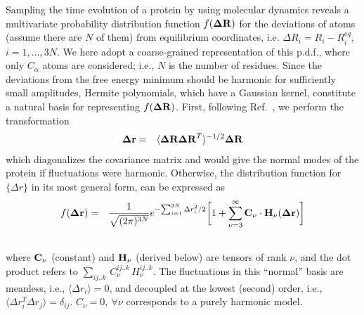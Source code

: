 \documentclass[prl,nofootinbib,twocolumn,floatfix,showpacs]{revtex4}
\begin{document}
Sampling the time evolution of a protein by using molecular dynamics
reveals a multivariate probability distribution function $f({\bf\Delta
  R})$ for the deviations of atoms (assume there are $N$ of them) from
equilibrium coordinates, i.e. $\Delta R_i = R_i - R_i^{eq}$,
$i=1,\dots,3N$. We here adopt a coarse-grained representation of this
p.d.f., where only $C_\alpha$ atoms are considered; i.e., $N$ is the
number of residues. Since the deviations from the free energy minimum
should be harmonic for sufficiently small amplitudes, Hermite
polynomials, which have a Gaussian kernel, constitute a natural basis
for representing $f({\bf\Delta R})$. First, following
Ref.~\cite{Yogurtcu}, we perform the transformation
\begin{eqnarray}
\label{transformation}
{\bf \Delta r} &=& \langle {\bf\Delta R \Delta R}^T\rangle ^{-1/2} {\bf
  \Delta R}
\end{eqnarray}
which diagonalizes the covariance matrix and would give the normal
modes of the protein if fluctuations were harmonic. Otherwise, the
distribution function for $\{\Delta r\}$ in its most general form, can
be expressed as~\cite{Flory}
\begin{eqnarray}
f({\bf\Delta r}) &=& \frac{1}{\sqrt{(2\pi)^{3N}}} e^{
    -{\sum_{i=1}^{3N} \Delta r_i^2}/2} \bigg[ 1 +  \sum_{\nu=3}^\infty
 {\bf C_\nu}\cdot {\bf H}_\nu({\bf \Delta r}) \bigg] \nonumber \\
&& \label{hermite_expansion}
\end{eqnarray}
where ${\bf C}_\nu$ (constant) and ${\bf H}_\nu$ (derived below) are
tensors of rank $\nu$, and the dot product refers to
$\sum_{ij..k}\,C_\nu^{ij..k}\,H_\nu^{ij..k}$.  The fluctuations in
this ``normal'' basis are meanless, i.e., $\langle {\Delta r_i}\rangle
= 0$, and decoupled at the lowest (second) order, i.e., $ \langle {
  \Delta r_i^T \Delta r_j}\rangle = \delta_{ij}$. $C_\nu = 0,\ \forall \nu$
corresponds to a purely harmonic model.
\end{document}
